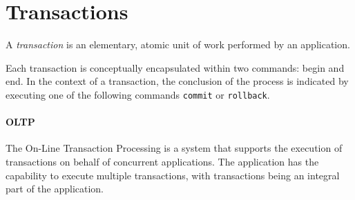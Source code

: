 \section{Transactions}

\begin{definition}
    A \emph{transaction} is an elementary, atomic unit of work performed by an application. 
\end{definition}
Each transaction is conceptually encapsulated within two commands: begin and end. 
In the context of a transaction, the conclusion of the process is indicated by executing one of the following commands \texttt{commit} or \texttt{rollback}.

\paragraph*{OLTP}
The On-Line Transaction Processing is a system that supports the execution of transactions on behalf of concurrent applications. 
The application has the capability to execute multiple transactions, with transactions being an integral part of the application. 

